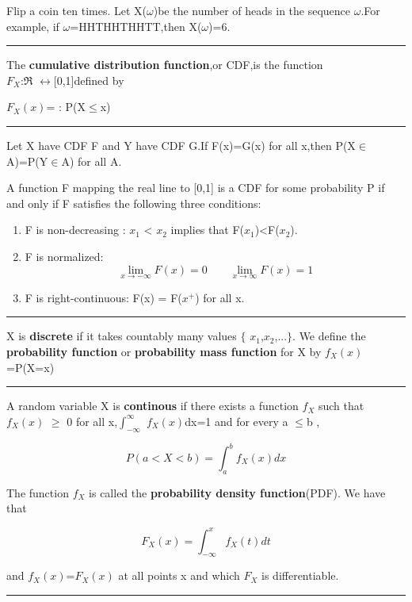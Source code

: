 \begin{ex} %
Flip a coin ten times. Let X($\omega$)be the number of heads in the sequence $\omega$.For example, if $\omega$=HHTHHTHHTT,then X($\omega$)=6.
\end{ex}

{\color{slight}\rule{\textwidth}{0.2pt}}
\begin{de} 
The \textbf{cumulative distribution function},or CDF,is the function \\
$F_X$:$\Re$ $\longleftrightarrow$[0,1]defined by\\
 \begin{center}
 $F_X(x)$= : P(X$\leqslant$x)\\
\end{center} 
{\color{slight}\rule{\textwidth}{0.2pt}}
\end{de}

\begin{thm}
Let X have CDF F and Y have CDF G.If F(x)=G(x) for all x,then P(X$\in$A)=P(Y$\in$A) for all A.
\end{thm}

\begin{thm}
A function F mapping the real line to [0,1] is a CDF for some probability P if and only if F satisfies the following three conditions:
\begin{enumerate}
\item F is non-decreasing : $x_1$ < $x_2$ implies that F($x_1$)<F($x_2$).
\item F is normalized:\\
$$\lim_{x \rightarrow -\infty}F(x)=0 \qquad \lim_{x \rightarrow \infty}F(x)=1$$
\item F is right-continuous: F(x) = F($x^+$) for all x.
\end{enumerate}
\end{thm}


{\color{slight}\rule{\textwidth}{0.2pt}}
\begin{de} 
X is \textbf{discrete} if it takes countably many values $\lbrace$ $x_1$,$x_2$,...$\rbrace$. We define the \textbf{probability function} or \textbf{probability mass function} for X by $f_X(x)$=P(X=x) \\
{\color{slight}\rule{\textwidth}{0.2pt}}
\end{de}

\begin{de} 
A random variable X is \textbf{continous} if there exists a function $f_X$ such that $f_X(x)$ $\ge$ 0  for all x,$\int_{-\infty}^{\infty}$ $f_X(x)$dx=1 and for every a $\le$b ,
\begin{center}
$$ P(a<X<b)=\int_{a}^{b}f_X(x)dx$$
\end{center}
The function $f_X$ is called the \textbf{probability density function}(PDF). We have that 
\begin{center}
$$ F_X(x)=\int_{-\infty}^{x}f_X(t)dt$$
\end{center}
and  $f_X(x)$=$F_X(x)$ at all points x and which $F_X$ is differentiable.\\
{\color{slight}\rule{\textwidth}{0.2pt}}
\end{de}


